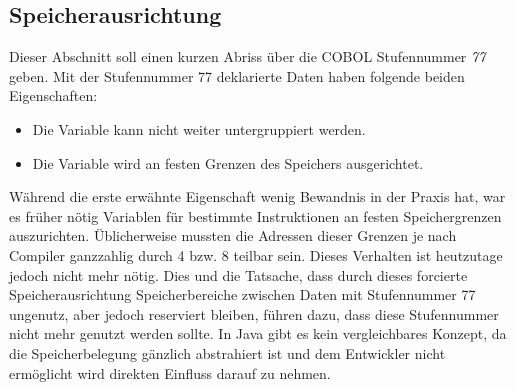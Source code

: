 \subsection{Speicherausrichtung}
Dieser Abschnitt soll einen kurzen Abriss über die COBOL Stufennummer \textit{77} geben. Mit der Stufennummer 77 deklarierte Daten haben folgende beiden Eigenschaften:
\begin{itemize}
    \item Die Variable kann nicht weiter untergruppiert werden.
    \item Die Variable wird an festen Grenzen des Speichers ausgerichtet.
\end{itemize}
Während die erste erwähnte Eigenschaft wenig Bewandnis in der Praxis hat, war es früher nötig Variablen für bestimmte Instruktionen an festen Speichergrenzen auszurichten. Üblicherweise mussten die Adressen dieser Grenzen je nach Compiler ganzzahlig durch 4 bzw. 8 teilbar sein. Dieses Verhalten ist heutzutage jedoch nicht mehr nötig. Dies und die Tatsache, dass durch dieses forcierte Speicherausrichtung Speicherbereiche zwischen Daten mit Stufennummer 77 ungenutz, aber jedoch reserviert bleiben, führen dazu, dass diese Stufennummer nicht mehr genutzt werden sollte.
In Java gibt es kein vergleichbares Konzept, da die Speicherbelegung gänzlich abstrahiert ist und dem Entwickler nicht ermöglicht wird direkten Einfluss darauf zu nehmen.